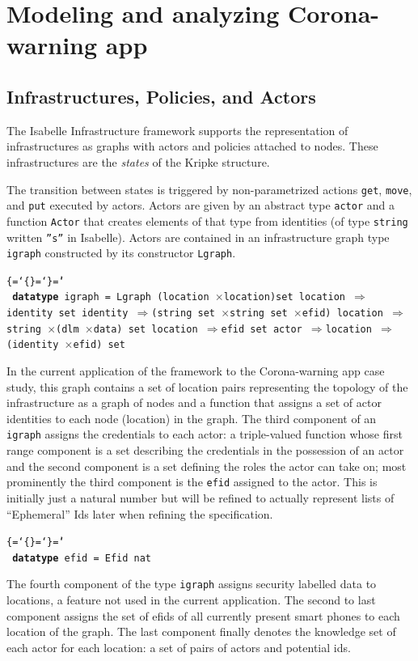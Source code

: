 \documentclass{llncs}
\newenvironment{ttbox}{\begin{alltt}\ttbraces\small\tt}%
                      {\end{alltt}}
\def\ttbraces{\let\.=\nobreak\chardef\{=`\{\chardef\}=`\}\chardef\|=`\\}
\newcommand\ttfun{\mbox{{$\Rightarrow$}}}
\newcommand\ttlam{\mbox{\( \lambda \)}}
\newcommand\tttimes{\mbox{\( \times \)}}
\begin{document}
\section{Modeling and analyzing Corona-warning app}
\label{sec:model}
\subsection{Infrastructures, Policies, and Actors}
\label{sec:infra}
The Isabelle Infrastructure framework supports the representation of infrastructures 
as graphs with actors and policies attached to nodes. These infrastructures 
are the {\it states} of the Kripke structure. %

The transition between states is triggered by non-parametrized
actions \texttt{get}, \texttt{move}, and \texttt{put} 
executed by actors. 
Actors are given by an abstract type \texttt{actor} and a function 
\texttt{Actor} that creates elements of that type from identities 
(of type \texttt{string} written \texttt{''s''} in Isabelle). 
Actors are contained in an infrastructure graph type \texttt{igraph}
constructed by its constructor \texttt{Lgraph}. 
\begin{ttbox}
{\bf datatype} igraph = 
         Lgraph (location \tttimes location)set 
                 location \ttfun identity set
                 identity \ttfun (string set \tttimes string set \tttimes efid)  
                 location \ttfun string \tttimes (dlm \tttimes data) set
                 location \ttfun efid set
                 actor \ttfun location \ttfun (identity \tttimes efid) set
\end{ttbox}
In the current application of the framework to the Corona-warning app case study, 
this graph contains a set of location pairs representing the %
topology of the infrastructure
as a graph of nodes and a function%
that assigns a set of actor identities to each node (location) in the graph.
The third component of an \texttt{igraph} assigns the credentials to each actor: 
a triple-valued function whose first range component is a set describing the credentials 
in the possession of an actor and the second component 
is a set defining the roles the actor can take on; 
most prominently the third component is the \texttt{efid} assigned to the actor. This is initially
just a natural number but will be refined to actually represent lists of ``Ephemeral'' Ids later
when refining the specification.
\begin{ttbox}
{\bf datatype} efid = Efid nat
\end{ttbox}
The fourth component of the type \texttt{igraph}
assigns security labelled data to locations, a feature not used in the
current application.
The second to last component assigns the set of efids of all currently present smart phones
to each location of the graph. The last component finally denotes the knowledge set of each
actor for each location: a set of pairs of actors and potential ids.
\end{document}

